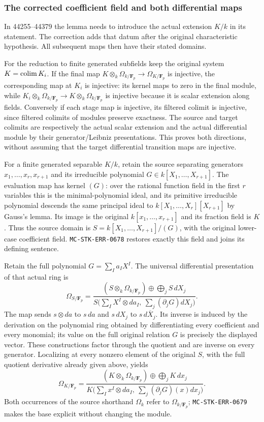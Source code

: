 \subsubsection{The corrected coefficient field and both differential maps}\label{algebra-proof-063-the-corrected-coefficient-field-and-both-differential-maps}

In 44255--44379 the lemma needs to introduce the actual extension \(K/k\) in its statement. The correction adds that datum after the original characteristic hypothesis. All subsequent maps then have their stated domains.

For the reduction to finite generated subfields keep the original system \(K=\mathop{\rm colim}K_i\). If the final map \(K\otimes_k\Omega_{k/\mathbf F_p}\to\Omega_{K/\mathbf F_p}\) is injective, the corresponding map at \(K_i\) is injective: its kernel maps to zero in the final module, while \(K_i\otimes_k\Omega_{k/\mathbf F_p}\to K\otimes_k\Omega_{k/\mathbf F_p}\) is injective because it is scalar extension along fields. Conversely if each stage map is injective, its filtered colimit is injective, since filtered colimits of modules preserve exactness. The source and target colimits are respectively the actual scalar extension and the actual differential module by their generator/Leibniz presentations. This proves both directions, without assuming that the target differential transition maps are injective.

For a finite generated separable \(K/k\), retain the source separating generators \(x_1,\ldots,x_r,x_{r+1}\) and its irreducible polynomial \(G\in k[X_1,\ldots,X_{r+1}]\). The evaluation map has kernel \((G)\): over the rational function field in the first \(r\) variables this is the minimal-polynomial ideal, and its primitive irreducible polynomial descends the same principal ideal to \(k[X_1,\ldots,X_r][X_{r+1}]\) by Gauss's lemma. Its image is the original \(k[x_1,\ldots,x_{r+1}]\) and its fraction field is \(K\). Thus the source domain is \(S=k[X_1,\ldots,X_{r+1}]/(G)\), with the original lower-case coefficient field. \texttt{MC-STK-ERR-0678} restores exactly this field and joins its defining sentence.

Retain the full polynomial \(G=\sum_I a_I X^I\). The universal differential presentation of that actual ring is \[
 \Omega_{S/\mathbf F_p}=
 \frac{(S\otimes_k\Omega_{k/\mathbf F_p})\oplus\bigoplus_j S\,dX_j}
 {S\bigl(\sum_I X^I\otimes da_I,\ \sum_j(\partial_jG)dX_j\bigr)}.
\] The map sends \(s\otimes da\) to \(s\,da\) and \(s\,dX_j\) to \(s\,d\overline X_j\). Its inverse is induced by the derivation on the polynomial ring obtained by differentiating every coefficient and every monomial; its value on the full original relation \(G\) is precisely the displayed vector. These constructions factor through the quotient and are inverse on every generator. Localizing at every nonzero element of the original \(S\), with the full quotient derivative already given above, yields \[
 \Omega_{K/\mathbf F_p}=
 \frac{(K\otimes_k\Omega_{k/\mathbf F_p})\oplus\bigoplus_j K\,dx_j}
 {K\bigl(\sum_I x^I\otimes da_I,\ \sum_j(\partial_jG)(x)dx_j\bigr)}.
\] Both occurrences of the source shorthand \(\Omega_k\) refer to \(\Omega_{k/\mathbf F_p}\); \texttt{MC-STK-ERR-0679} makes the base explicit without changing the module.

